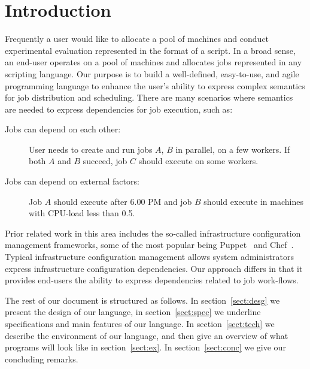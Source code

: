 \section{Introduction}
\label{sect:intro}

Frequently a user would like to allocate a pool of machines and conduct experimental evaluation represented in the format of a script. In a
broad sense, an end-user operates on a pool of machines and allocates jobs
represented in any scripting language. Our purpose is to build a well-defined,
easy-to-use, and agile programming language to enhance the user's ability to express complex semantics for job distribution and scheduling. There are many scenarios where semantics are needed to express dependencies for job execution, such as:
\begin{description}
\item[Jobs can depend on each other:] User needs to create and run jobs $A$,
$B$ in parallel, on a few workers. If both $A$ and $B$ succeed, job $C$ should
execute on some workers.
\item[Jobs can depend on external factors:] Job $A$ should execute after 6.00 PM
and job $B$ should execute in machines with CPU-load less than 0.5.
\end{description}

Prior related work in this area includes the so-called infrastructure
configuration management frameworks, some of the most popular being
Puppet~\cite{puppet} and Chef~\cite{chef}. Typical infrastructure
configuration management allows system administrators express
infrastructure configuration dependencies. Our approach differs in that
it provides end-users the ability to express dependencies related to
job work-flows.

The rest of our document is structured as follows. In section~\ref{sect:desg} we
present the design of our language, in section~\ref{sect:spec} we underline
specifications and main features of our language. In section~\ref{sect:tech} we
describe the environment of our language, and then give an overview of what
programs will look like in section~\ref{sect:ex}. In section~\ref{sect:conc} we
give our concluding remarks.
